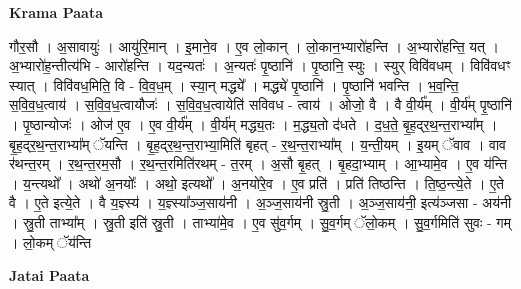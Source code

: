 \documentclass[17pt]{extarticle}
\begin{document}
\textbf{Krama Paata} \newline

गौर॒सौ । अ॒सावायुः॑ । आयु॑रि॒मान् । इ॒माने॒व । ए॒व लो॒कान् । लो॒कान॒भ्यारो॑हन्ति । अ॒भ्यारो॑हन्ति॒ यत् । अ॒भ्यारो॑ह॒न्तीत्य॑भि - आरो॑हन्ति । यद॒न्यतः॑ । अ॒न्यतः॑ पृ॒ष्ठानि॑ । पृ॒ष्ठानि॒ स्युः । स्युर् विवि॑वधम् । विवि॑वधꣳ स्यात् । विवि॑वध॒मिति॒ वि - वि॒व॒ध॒म् । स्या॒न् मद्ध्ये᳚ । मद्ध्ये॑ पृ॒ष्ठानि॑ । पृ॒ष्ठानि॑ भवन्ति । भ॒व॒न्ति॒ स॒वि॒व॒ध॒त्वाय॑ । स॒वि॒व॒ध॒त्वायौजः॑ । स॒वि॒व॒ध॒त्वायेति॑ सविवध - त्वाय॑ । ओजो॒ वै । वै वी॒र्य᳚म् । वी॒र्य॑म् पृ॒ष्ठानि॑ । पृ॒ष्ठान्योजः॑ । ओज॑ ए॒व । ए॒व वी॒र्य᳚म् । वी॒र्य॑म् मद्ध्य॒तः । म॒द्ध्य॒तो द॑धते । द॒ध॒ते॒ बृ॒ह॒द्‍र॒थ॒न्त॒राभ्या᳚म् । बृ॒ह॒द्‍र॒थ॒न्त॒राभ्या᳚म् ॅयन्ति । बृ॒ह॒द्‍र॒थ॒न्त॒राभ्या॒मिति॑ बृहत् - र॒थ॒न्त॒राभ्या᳚म् । य॒न्ती॒यम् । इ॒यम् ॅवाव । वाव र॑थन्त॒रम् । र॒थ॒न्त॒रम॒सौ । र॒थ॒न्त॒रमिति॑रथम् - त॒रम् । अ॒सौ बृ॒हत् । बृ॒हदा॒भ्याम् । आ॒भ्यामे॒व । ए॒व य॑न्ति । य॒न्त्यथो᳚ । अथो॑ अ॒नयोः᳚ । अथो॒ इत्यथो᳚ । अ॒नयो॑रे॒व । ए॒व प्रति॑ । प्रति॑ तिष्ठन्ति । ति॒ष्ठ॒न्त्ये॒ते । ए॒ते वै । ए॒ते इत्ये॒ते । वै य॒ज्ञ्स्य॑ । य॒ज्ञ्स्या᳚ञ्ज॒साय॑नी । अ॒ञ्ज॒साय॑नी स्रु॒ती । अ॒ञ्ज॒साय॑नी॒ इत्य॑ञ्जसा - अय॑नी । स्रु॒ती ताभ्या᳚म् । स्रु॒ती इति॑ स्रु॒ती । ताभ्या॑मे॒व । ए॒व सु॑व॒र्गम् । सु॒व॒र्गम् ॅलो॒कम् । सु॒व॒र्गमिति॑ सुवः - गम् । लो॒कम् ॅय॑न्ति \newline

\textbf{Jatai Paata} \newline
\end{document}
